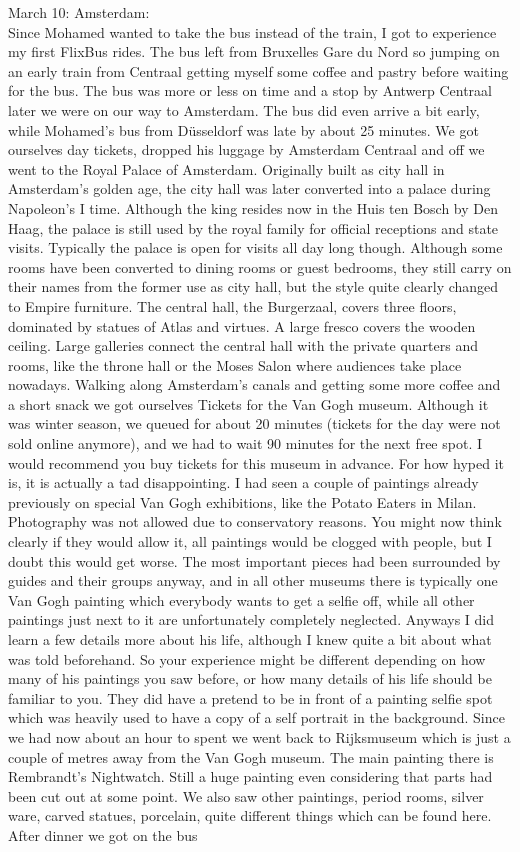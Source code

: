 March 10: Amsterdam:\\
Since Mohamed wanted to take the bus instead of the train, I got to experience my first FlixBus rides. The bus left from Bruxelles Gare du Nord so jumping on an early train from Centraal getting myself some coffee and pastry before waiting for the bus. The bus was more or less on time and a stop by Antwerp Centraal later we were on our way to Amsterdam. The bus did even arrive a bit early, while Mohamed's bus from D\"usseldorf was late by about 25 minutes. We got ourselves day tickets, dropped his luggage by Amsterdam Centraal and off we went to the Royal Palace of Amsterdam. Originally built as city hall in Amsterdam's golden age, the city hall was later converted into a palace during Napoleon's I time. Although the king resides now in the Huis ten Bosch by Den Haag, the palace is still used by the royal family for official receptions and state visits. Typically the palace is open for visits all day long though. Although some rooms have been converted to dining rooms or guest bedrooms, they still carry on their names from the former use as city hall, but the style quite clearly changed to Empire furniture. The central hall, the Burgerzaal, covers three floors, dominated by statues of Atlas and virtues. A large fresco covers the wooden ceiling. Large galleries connect the central hall with the private quarters and rooms, like the throne hall or the Moses Salon where audiences take place nowadays. Walking along Amsterdam's canals and getting some more coffee and a short snack we got ourselves Tickets for the Van Gogh museum. Although it was winter season, we queued for about 20 minutes (tickets for the day were not sold online anymore), and we had to wait 90 minutes for the next free spot. I would recommend you buy tickets for this museum in advance. For how hyped it is, it is actually a tad disappointing. I had seen a couple of paintings already previously on special Van Gogh exhibitions, like the Potato Eaters in Milan. Photography was not allowed due to conservatory reasons. You might now think clearly if they would allow it, all paintings would be clogged with people, but I doubt this would get worse. The most important pieces had been surrounded by guides and their groups anyway, and in all other museums there is typically one Van Gogh painting which everybody wants to get a selfie off, while all other paintings just next to it are unfortunately completely neglected. Anyways I did learn a few details more about his life, although I knew quite a bit about what was told beforehand. So your experience might be different depending on how many of his paintings you saw before, or how many details of his life should be familiar to you. They did have a pretend to be in front of a painting selfie spot which was heavily used to have a copy of a self portrait in the background. Since we had now about an hour to spent we went back to Rijksmuseum which is just a couple of metres away from the Van Gogh museum. The main painting there is Rembrandt's Nightwatch. Still a huge painting even considering that parts had been cut out at some point. We also saw other paintings, period rooms, silver ware, carved statues, porcelain, quite different things which can be found here. After dinner we got on the bus 
